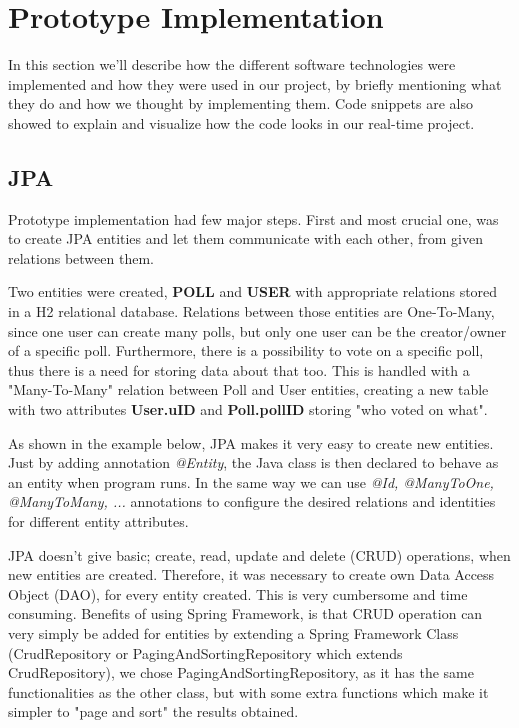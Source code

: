 \section{Prototype Implementation}
\label{sec:implementation}
In this section we'll describe how the different software technologies were implemented and how they were used in our project, by briefly mentioning what they do and how we thought by implementing them. Code snippets are also showed to explain and visualize how the code looks in our real-time project.

\subsection{JPA}\label{sub:jpa}
Prototype implementation had few major steps. First and most crucial one, was to create JPA entities and let them communicate with each other, from given relations between them.

Two entities were created, \textbf{POLL} and \textbf{USER} with appropriate relations stored in a H2 relational database. Relations between those entities are One-To-Many, since one user can create many polls, but only one user can be the creator/owner of a specific poll. Furthermore, there is a possibility to vote on a specific poll, thus there is a need for storing data about that too. This is handled with a "Many-To-Many" relation between Poll and User entities, creating a new table with two attributes \textbf{User.uID} and \textbf{Poll.pollID} storing "who voted on what".

As shown in the example below, JPA makes it very easy to create new entities. Just by adding annotation \textit{@Entity}, the Java class is then declared to behave as an entity when program runs. In the same way we can use \textit{@Id, @ManyToOne, @ManyToMany, ...} annotations to configure the desired relations and identities for different entity attributes.



JPA doesn't give basic; create, read, update and delete (CRUD) operations, when new entities are created. Therefore, it was necessary to create own Data Access Object (DAO), for every entity created. This is very cumbersome and time consuming. Benefits of using Spring Framework, is that CRUD operation can very simply be added for entities by extending a Spring Framework Class (CrudRepository or PagingAndSortingRepository which extends CrudRepository), we chose PagingAndSortingRepository, as it has the same functionalities as the other class, but with some extra functions which make it simpler to "page and sort" the results obtained.  

